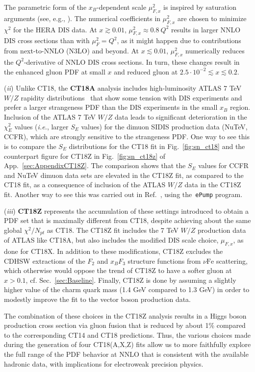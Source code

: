 The parametric form of the $x_B$-dependent scale
$\mu^2_{F,x}$ is inspired by saturation arguments (see, e.g.,
\cite{GolecBiernat:1998js,Caola:2009iy}). The numerical coefficients in $\mu^2_{F,x}$
are chosen to  minimize $\chi^2$ for the HERA DIS data.
At $x\gtrsim 0.01$, $\mu_{F,x}^2\approx 0.8\ Q^2$ results in larger NNLO DIS cross sections than with $\mu_{F}^2=Q^2$, as it might happen due to contributions from next-to-NNLO (N3LO) and beyond. At $x \lesssim 0.01$, $\mu_{F,x}^2$ numerically reduces the 
$Q^2$-derivative of NNLO DIS cross sections. In turn, these changes result in the enhanced gluon PDF at small $x$ and
reduced gluon at $2.5\cdot 10^{-2} \lesssim  x\lesssim 0.2$.

({\it ii}) Unlike CT18, the {\bf CT18A} analysis includes
high-luminosity ATLAS 7 TeV $W/Z$ rapidity distributions~\cite{Aaboud:2016btc}
that show some tension with DIS experiments and prefer a larger strangeness PDF than the
DIS experiments in the small $x_B$ region. Inclusion of the ATLAS 7 TeV $W/Z$ data leads to
significant deterioration in the $\chi^2_E$ values ({\it i.e.}, larger $S_E$ values)
for the dimuon SIDIS production data (NuTeV, CCFR), which are strongly
sensitive to the strangeness PDF. One way to see this is to compare
the $S_E$ distributions for the CT18 fit in Fig.~\ref{fig:sn_ct18} and the counterpart figure for CT18Z in Fig.~\ref{fig:sn_ct18z} of App.~\ref{sec:AppendixCT18Z}.
The comparison shows that the $S_E$ values for CCFR and NuTeV dimuon data sets are elevated in the CT18Z fit, as compared to the CT18 fit, as a consequence of inclusion of the
ATLAS $W/Z$ data in the CT18Z fit.
Another way to see this was carried out in Ref.~\cite{Hou:2019gfw}, using the~\texttt{ePump} program.   

({\it iii}) {\bf CT18Z} represents the accumulation of these settings introduced to obtain a PDF set that is maximally different from CT18,  despite achieving about the same global $\chi^2/N_{pt}$ as CT18. The CT18Z fit
includes the 7 TeV $W/Z$ production data of ATLAS like CT18A, but
also includes the modified DIS scale choice, $\mu_{F,x}$,
as done for CT18X. In addition to these modifications, CT18Z
excludes the CDHSW extractions of the $F_2$ and $x_B F_3$ structure functions
from $\nu\mathrm{Fe}$ scattering, which otherwise would oppose the trend of CT18Z to have a softer gluon at $x>0.1$, cf. Sec.~\ref{sec:Baseline}. Finally, CT18Z is done by assuming a slightly higher value of
the charm quark mass (1.4 GeV compared to 1.3 GeV) in order to modestly improve the fit to the vector boson production data.

The combination of these choices in the
CT18Z analysis results in a Higgs boson production cross section via gluon
fusion that is reduced by about 1\% compared to the corresponding
CT14 and CT18 predictions. Thus, the various choices made during the
generation of four CT18(A,X,Z) fits allow us to more faithfully
explore the full range of the PDF behavior at NNLO that is consistent
with the available hadronic data, with implications for electroweak precision physics.
